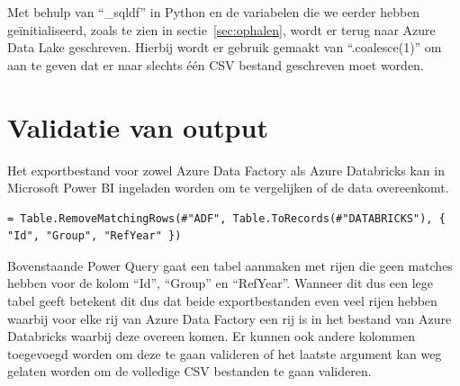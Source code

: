 Met behulp van ``\_sqldf'' in Python en de variabelen die we eerder hebben geïnitialiseerd, zoals te zien in sectie~\ref{sec:ophalen}, wordt er terug naar Azure Data Lake geschreven. Hierbij wordt er gebruik gemaakt van ``.coalesce(1)'' om aan te geven dat er naar slechts één CSV bestand geschreven moet worden.

\section{Validatie van output}

Het exportbestand voor zowel Azure Data Factory als Azure Databricks kan in Microsoft Power BI ingeladen worden om te vergelijken of de data overeenkomt. 

\begin{verbatim}
= Table.RemoveMatchingRows(#"ADF", Table.ToRecords(#"DATABRICKS"), { "Id", "Group", "RefYear" })
\end{verbatim}

Bovenstaande Power Query gaat een tabel aanmaken met rijen die geen matches hebben voor de kolom ``Id'', ``Group'' en ``RefYear''. Wanneer dit dus een lege tabel geeft betekent dit dus dat beide exportbestanden even veel rijen hebben waarbij voor elke rij van Azure Data Factory een rij is in het bestand van Azure Databricks waarbij deze overeen komen. Er kunnen ook andere kolommen toegevoegd worden om deze te gaan valideren of het laatste argument kan weg gelaten worden om de volledige CSV bestanden te gaan valideren.